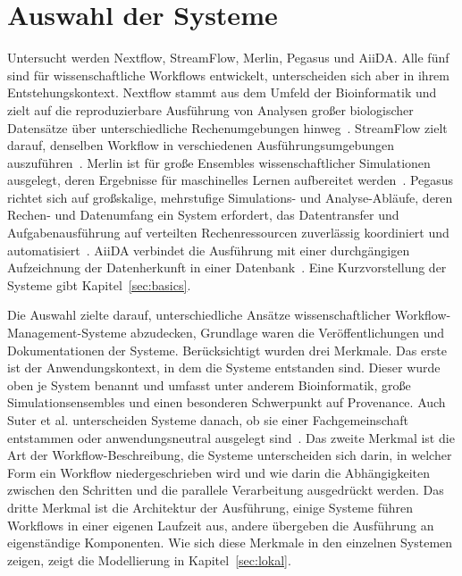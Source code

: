 \section{Auswahl der Systeme}
\label{sec:methodik:auswahl}
Untersucht werden Nextflow, StreamFlow, Merlin, Pegasus und AiiDA. Alle fünf sind für wissenschaftliche Workflows entwickelt, unterscheiden sich aber in ihrem Entstehungskontext. Nextflow stammt aus dem Umfeld der Bioinformatik und zielt auf die reproduzierbare Ausführung von Analysen großer biologischer Datensätze über unterschiedliche Rechenumgebungen hinweg~\cite[S.~316]{ditommaso2017nextflow}. StreamFlow zielt darauf, denselben Workflow in verschiedenen Ausführungsumgebungen auszuführen~\cite[S.~1723]{colonnelli2021streamflow}. Merlin ist für große Ensembles wissenschaftlicher Simulationen ausgelegt, deren Ergebnisse für maschinelles Lernen aufbereitet werden~\cite[S.~255]{peterson2022merlin}. Pegasus richtet sich auf großskalige, mehrstufige Simulations- und Analyse-Abläufe, deren Rechen- und Datenumfang ein System erfordert, das Datentransfer und Aufgabenausführung auf verteilten Rechenressourcen zuverlässig koordiniert und automatisiert~\cite[S.~17]{deelman2015pegasus}. AiiDA verbindet die Ausführung mit einer durchgängigen Aufzeichnung der Datenherkunft in einer Datenbank~\cite[S.~1]{huber2020aiida}. Eine Kurzvorstellung der Systeme gibt Kapitel~\ref{sec:basics}.

Die Auswahl zielte darauf, unterschiedliche Ansätze
wissenschaftlicher Workflow-Management-Systeme abzudecken, Grundlage
waren die Veröffentlichungen und Dokumentationen der Systeme.
Berücksichtigt wurden drei Merkmale. Das erste ist der Anwendungskontext, in dem die Systeme entstanden sind. Dieser wurde oben je System benannt und umfasst unter anderem Bioinformatik, große Simulationsensembles und einen besonderen Schwerpunkt auf Provenance. Auch Suter
et al. unterscheiden Systeme danach, ob sie einer Fachgemeinschaft
entstammen oder anwendungsneutral ausgelegt
sind~\cite[S.~4]{suter2026terminology}. Das zweite
Merkmal ist die Art der Workflow-Beschreibung, die Systeme
unterscheiden sich darin, in welcher Form ein Workflow
niedergeschrieben wird und wie darin die Abhängigkeiten zwischen den
Schritten und die parallele Verarbeitung ausgedrückt werden. Das
dritte Merkmal ist die Architektur der Ausführung, einige Systeme
führen Workflows in einer eigenen Laufzeit aus, andere übergeben die
Ausführung an eigenständige Komponenten. Wie sich diese Merkmale in den
einzelnen Systemen zeigen, zeigt die Modellierung in
Kapitel~\ref{sec:lokal}.

